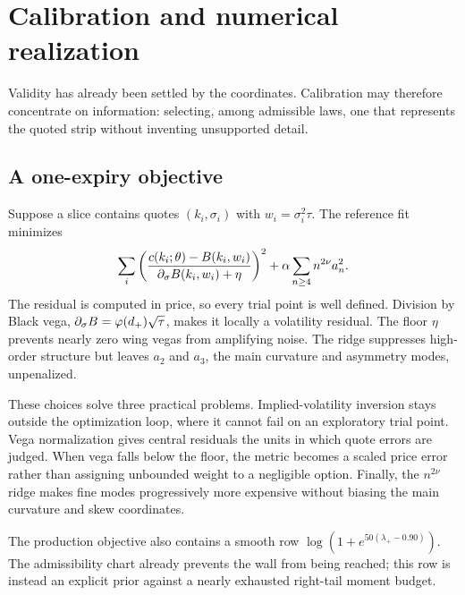 \section{Calibration and numerical realization}
\label{sec:calibration}

Validity has already been settled by the coordinates.  Calibration may
therefore concentrate on information: selecting, among admissible laws, one
that represents the quoted strip without inventing unsupported detail.

\subsection{A one-expiry objective}

Suppose a slice contains quotes $(k_i,\sigma_i)$ with
$w_i=\sigma_i^2\tau$.  The reference fit minimizes
\begin{equation}
\sum_i\left(
\frac{c(k_i;\theta)-B(k_i,w_i)}
     {\partial_\sigma B(k_i,w_i)+\eta}
\right)^2
+\alpha\sum_{n\ge4}n^{2\nu}a_n^2.
\label{eq:objective}
\end{equation}
The residual is computed in price, so every trial point is well defined.
Division by Black vega,
$\partial_\sigma B=\varphi(d_+)\sqrt\tau$, makes it locally a volatility
residual.  The floor $\eta$ prevents nearly zero wing vegas from amplifying
noise.  The ridge suppresses high-order structure but leaves $a_2$ and $a_3$,
the main curvature and asymmetry modes, unpenalized.

These choices solve three practical problems.  Implied-volatility inversion
stays outside the optimization loop, where it cannot fail on an exploratory
trial point.  Vega normalization gives central residuals the units in which
quote errors are judged.  When vega falls below the floor, the metric becomes
a scaled price error rather than assigning unbounded weight to a negligible
option.  Finally, the $n^{2\nu}$ ridge makes fine modes progressively more
expensive without biasing the main curvature and skew coordinates.

The production objective also contains a smooth row
$\log(1+e^{50(\lambda_+-0.90)})$.  The admissibility chart already prevents
the wall from being reached; this row is instead an explicit prior against a
nearly exhausted right-tail moment budget.

